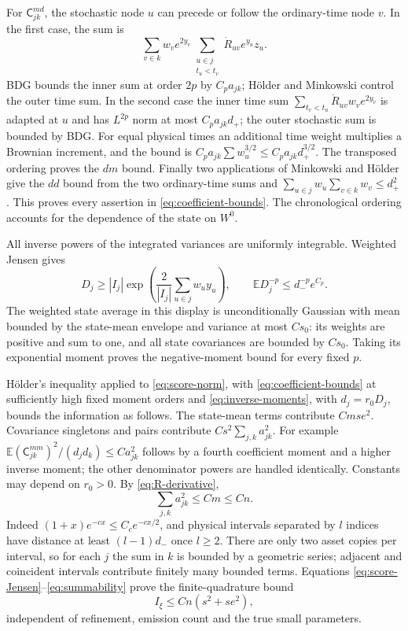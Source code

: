 \documentclass[11pt,a4paper]{amsart}
\theoremstyle{plain}
\theoremstyle{definition}
\theoremstyle{remark}
\newcommand{\EE}{\mathbb{E}}
\begin{document}
For $\mathsf C^{md}_{jk}$, the stochastic node
$u$ can precede or follow the ordinary-time node $v$. In the first case,
the sum is
\[
 \sum_{v\in k}w_ve^{2y_v}
       \sum_{\substack{u\in j\\t_u<t_v}}
                      \dot R_{uv}e^{y_u}z_u.
\]
BDG bounds the inner sum at order $2p$ by $C_pa_{jk}$; H\"older and
Minkowski control the outer time sum. In the second case the inner time
sum $\sum_{t_v<t_u}\dot R_{uv}w_ve^{2y_v}$ is adapted at $u$ and has
$L^{2p}$ norm at most $C_pa_{jk}d_+$; the outer stochastic sum is bounded
by BDG. For equal physical times an additional time weight multiplies a
Brownian increment, and the bound is
$C_pa_{jk}\sum w_u^{3/2}\le C_pa_{jk}d_+^{3/2}$.
The transposed ordering proves the $dm$ bound. Finally two applications
of Minkowski and H\"older give the $dd$ bound from the two ordinary-time
sums and $\sum_{u\in j}w_u\sum_{v\in k}w_v\le d_+^2$.
This proves every assertion in \eqref{eq:coefficient-bounds}. The chronological
ordering accounts for the dependence of the state on $W^0$.

All inverse powers of the integrated variances are uniformly integrable.
Weighted Jensen gives
\begin{equation}\label{eq:inverse-moments}
 D_j\ge |I_j|\exp\left(\frac2{|I_j|}\sum_{u\in j}w_uy_u\right),
 \qquad \EE D_j^{-p}\le d_-^{-p}e^{C_p}.
\end{equation}
The weighted state average in this display is unconditionally Gaussian
with mean bounded by the state-mean envelope and variance at most
$Cs_0$: its weights are positive and sum to one, and all state
covariances are bounded by $Cs_0$. Taking its exponential moment proves
the negative-moment bound for every fixed $p$.

H\"older's inequality applied to \eqref{eq:score-norm}, with
\eqref{eq:coefficient-bounds} at sufficiently high fixed moment orders
and \eqref{eq:inverse-moments}, with $d_j=r_0D_j$, bounds the information
as follows. The state-mean terms contribute $Cmse^2$. Covariance singletons
and pairs contribute
$Cs^2\sum_{j,k}a_{jk}^2$. For example
$\EE(\mathsf C^{mm}_{jk})^2/(d_jd_k)\le Ca_{jk}^2$ follows by a fourth
coefficient moment and a higher inverse moment; the other denominator
powers are handled identically. Constants may depend on $r_0>0$.
By \eqref{eq:R-derivative},
\begin{equation}\label{eq:summability}
 \sum_{j,k}a_{jk}^2\le Cm\le Cn.
\end{equation}
Indeed $(1+x)e^{-cx}\le C_ce^{-cx/2}$, and physical intervals separated
by $l$ indices have distance at least $(l-1)d_-$ once $l\ge2$.
There are only two asset copies per interval, so for each $j$ the sum
in $k$ is bounded by a geometric series; adjacent and coincident
intervals contribute finitely many bounded terms. Equations
\eqref{eq:score-Jensen}--\eqref{eq:summability} prove the finite-quadrature
bound
\begin{equation}\label{eq:finite-information}
 I_\xi\le Cn(s^2+se^2),
\end{equation}
independent of refinement, emission count and the true small parameters.
\end{document}

